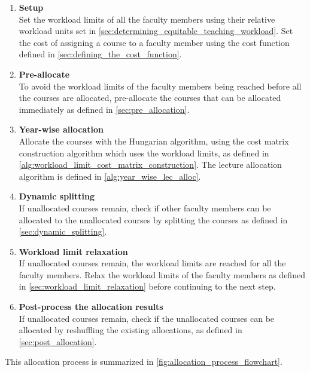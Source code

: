 \begin{enumerate}
  \item \textbf{Setup}\\
        Set the workload limits of all the faculty members using their relative workload units set in \autoref{sec:determining_equitable_teaching_workload}. Set the cost of assigning a course to a faculty member using the cost function defined in \autoref{sec:defining_the_cost_function}.
  \item \textbf{Pre-allocate}\\
        To avoid the workload limits of the faculty members being reached before all the courses are allocated, pre-allocate the courses that can be allocated immediately as defined in \autoref{sec:pre_allocation}.
  \item \textbf{Year-wise allocation}\\
        Allocate the courses with the Hungarian algorithm, using the cost matrix construction algorithm which uses the workload limits, as defined in \autoref{alg:workload_limit_cost_matrix_construction}. The lecture allocation algorithm is defined in \autoref{alg:year_wise_lec_alloc}.
  \item \textbf{Dynamic splitting}\\
        If unallocated courses remain, check if other faculty members can be allocated to the unallocated courses by splitting the courses as defined in \autoref{sec:dynamic_splitting}.
  \item \textbf{Workload limit relaxation}\\
        If unallocated courses remain, the workload limits are reached for all the faculty members. Relax the workload limits of the faculty members as defined in \autoref{sec:workload_limit_relaxation} before continuing to the next step.
  \item \textbf{Post-process the allocation results}\\
        If unallocated courses remain, check if the unallocated courses can be allocated by reshuffling the existing allocations, as defined in \autoref{sec:post_allocation}.
\end{enumerate}

This allocation process is summarized in \autoref{fig:allocation_process_flowchart}.

